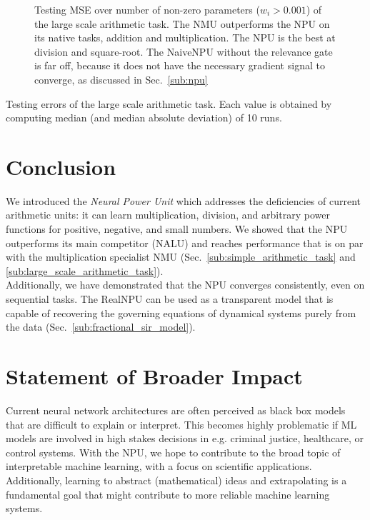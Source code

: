 \documentclass[9pt]{article}
\begin{document}
\begin{figure}
  \centering
  \resizebox{\textwidth}{!}{}
  \caption{Testing MSE over number of non-zero parameters ($w_i > 0.001$) of the large scale
  arithmetic task. The NMU outperforms the NPU on its
  native tasks, addition and multiplication. The NPU is the best at division
  and square-root.  The NaiveNPU without the relevance gate is far off, because
  it does not have the necessary gradient signal to converge, as discussed in
  Sec.~\ref{sub:npu}}%
  \label{fig:pareto}
\end{figure}

\begin{table}
  \centering
  \caption{Testing errors of the large scale arithmetic task. Each value is
  obtained by computing median (and median absolute deviation) of 10 runs.}
  \label{tab:arithmetic100_val}
  \small
  
\end{table}

 
\section{Conclusion}%
\label{sec:conclusion}

We introduced the \emph{Neural Power Unit} which addresses the deficiencies
of current arithmetic units: it can learn multiplication, division, and arbitrary power functions for
positive, negative, and small numbers. We showed that the NPU outperforms its
main competitor (NALU) and reaches performance that is on par with the
multiplication specialist NMU (Sec.~\ref{sub:simple_arithmetic_task} and
\ref{sub:large_scale_arithmetic_task}).\\
Additionally, we have demonstrated that the NPU converges consistently, even on
sequential tasks. The RealNPU can be used as a transparent model that
is capable of recovering the governing equations of dynamical systems purely
from the data (Sec.~\ref{sub:fractional_sir_model}).

\section{Statement of Broader Impact}%
\label{sec:statement_of_broader_impact}

Current neural network architectures are often perceived as black box models
that are difficult to explain or interpret. This becomes highly problematic if
ML models are involved in high stakes decisions in e.g. criminal justice,
healthcare, or control systems.  With the NPU, we hope to contribute to the
broad topic of interpretable machine learning, with a focus on scientific
applications.
Additionally, learning to abstract (mathematical) ideas and extrapolating is a
fundamental goal that might contribute to more reliable machine learning
systems.
\end{document}
